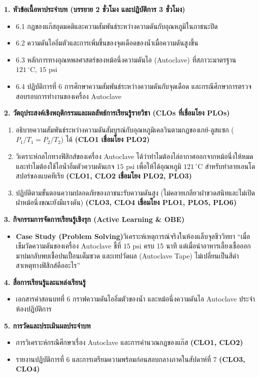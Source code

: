 \cleardoublepage
{}
\begin{planbox}
\noindent\textbf{1. หัวข้อเนื้อหาประจำบท (บรรยาย 2 ชั่วโมง และปฏิบัติการ 3 ชั่วโมง)}
\begin{itemize}
    \item 6.1 กฎของแก๊สอุดมคติและความสัมพันธ์ระหว่างความดันกับอุณหภูมิในภาชนะปิด
    \item 6.2 ความดันไออิ่มตัวและการเพิ่มขึ้นของจุดเดือดของน้ำเมื่อความดันสูงขึ้น
    \item 6.3 หลักการทางอุณหพลศาสตร์ของหม้อนึ่งความดันไอ (Autoclave) ที่สภาวะมาตรฐาน $121\,^\circ\text{C}$, $15\text{ psi}$
    \item 6.4 ปฏิบัติการที่ 6 การศึกษาความสัมพันธ์ระหว่างความดันกับจุดเดือด และกรณีศึกษาการตรวจสอบรอบการทำงานของเครื่อง Autoclave
\end{itemize}

\noindent\textbf{2. วัตถุประสงค์เชิงพฤติกรรมและผลลัพธ์การเรียนรู้รายวิชา (CLOs ที่เชื่อมโยง PLOs)}
\begin{enumerate}
    \item อธิบายความสัมพันธ์ระหว่างความดันสัมบูรณ์กับอุณหภูมิเคลวินตามกฎของเกย์-ลูสแซก ($P_1 / T_1 = P_2 / T_2$) ได้ \textbf{(CLO1 เชื่อมโยง PLO2)}
    \item วิเคราะห์กลไกทางฟิสิกส์ของเครื่อง Autoclave ได้ว่าทำไมต้องไล่อากาศออกจากหม้อนึ่งให้หมด และทำไมต้องใช้ไอน้ำอิ่มตัวความดันเกจ $15\text{ psi}$ เพื่อให้ได้อุณหภูมิ $121\,^\circ\text{C}$ สำหรับทำลายเอนโดสปอร์ของแบคทีเรีย \textbf{(CLO1, CLO2 เชื่อมโยง PLO2, PLO3)}
    \item ปฏิบัติตามขั้นตอนความปลอดภัยของภาชนะรับความดันสูง (ไม่คลายเกลียวฝาขวดสนิทและไม่เปิดฝาหม้อนึ่งขณะยังมีแรงดัน) \textbf{(CLO3, CLO4 เชื่อมโยง PLO1, PLO5, PLO6)}
\end{enumerate}

\noindent\textbf{3. กิจกรรมการจัดการเรียนรู้เชิงรุก (Active Learning \& OBE)}
\begin{itemize}
    \item \textbf{Case Study (Problem Solving)}\quad วิเคราะห์เหตุการณ์จริงในห้องแล็บจุลชีววิทยา ``เมื่อเข็มวัดความดันของเครื่อง Autoclave ชี้ที่ $15\text{ psi}$ ครบ 15 นาที แต่เมื่อนำอาหารเลี้ยงเชื้อออกมาบ่มกลับพบเชื้อปนเปื้อนเต็มขวด และเทปวัดผล (Autoclave Tape) ไม่เปลี่ยนเป็นสีดำ สาเหตุทางฟิสิกส์คืออะไร''
\end{itemize}

\noindent\textbf{4. สื่อการเรียนรู้และแหล่งเรียนรู้}
\begin{itemize}
    \item เอกสารคำสอนบทที่ 6 กราฟความดันไออิ่มตัวของน้ำ และหม้อนึ่งความดันไอ Autoclave ประจำห้องปฏิบัติการ
\end{itemize}

\noindent\textbf{5. การวัดและประเมินผลประจำบท}
\begin{itemize}
    \item การวิเคราะห์กรณีศึกษาเรื่อง Autoclave และการคำนวณกฎของแก๊ส \textbf{(CLO1, CLO2)}
    \item รายงานปฏิบัติการที่ 6 และการเตรียมความพร้อมก่อนสอบกลางภาคในสัปดาห์ที่ 7 \textbf{(CLO3, CLO4)}
\end{itemize}
\end{planbox}
